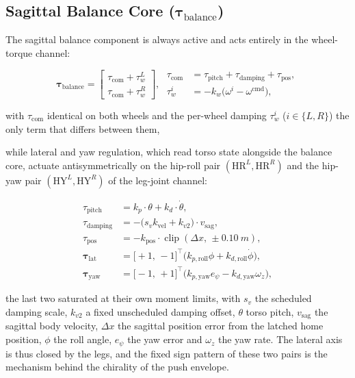 \documentclass{jcd}
\begin{document}
\subsection{Sagittal Balance Core ($\boldsymbol{\tau}_{\text{balance}}$)}
\label{sec:balance_core}

The sagittal balance component is always active and acts entirely in the
wheel-torque channel:

\begin{equation}
\boldsymbol{\tau}_{\text{balance}} =
\begin{bmatrix}
\tau_{\text{com}} + \tau_{w}^{L} \\
\tau_{\text{com}} + \tau_{w}^{R}
\end{bmatrix},
\;
\begin{aligned}
\tau_{\text{com}} &= \tau_{\text{pitch}} + \tau_{\text{damping}} + \tau_{\text{pos}},\\
\tau_{w}^{i} &= -k_{w}\big(\omega^{i} - \omega^{\text{cmd}}\big),
\end{aligned}
\label{eq:balance}
\end{equation}

with $\tau_{\text{com}}$ identical on both wheels and the per-wheel damping
$\tau_{w}^{i}$ ($i\in\{L,R\}$) the only term that differs between them,

while lateral and yaw regulation, which read torso state alongside the balance
core, actuate antisymmetrically on the hip-roll pair
$(\mathrm{HR}^L,\mathrm{HR}^R)$ and the hip-yaw pair
$(\mathrm{HY}^L,\mathrm{HY}^R)$ of the leg-joint channel:

\begin{align}
\tau_{\text{pitch}} &= k_p\cdot\theta + k_d\cdot\dot{\theta},\\
\tau_{\text{damping}} &= -\big(s_v k_{\text{vel}} + k_{v2}\big)\cdot v_{\text{sag}},\\
\tau_{\text{pos}} &= -k_{\text{pos}}\cdot\operatorname{clip}(\Delta x,\,\pm\SI{0.10}{m}),\\
\boldsymbol{\tau}_{\text{lat}} &= \big[{+}1,\,{-}1\big]^{\!\top}
\big(k_{p,\text{roll}}\phi + k_{d,\text{roll}}\dot{\phi}\big),
\label{eq:lat_yaw}\\
\boldsymbol{\tau}_{\text{yaw}} &= \big[{-}1,\,{+}1\big]^{\!\top}
\big(k_{p,\text{yaw}}e_\psi - k_{d,\text{yaw}}\omega_z\big),
\end{align}

the last two saturated at their own moment limits, with $s_v$ the scheduled
damping scale, $k_{v2}$ a fixed unscheduled damping offset, $\theta$ torso pitch,
$v_{\text{sag}}$ the sagittal body velocity, $\Delta x$ the sagittal position
error from the latched home position, $\phi$ the roll angle, $e_\psi$ the yaw
error and $\omega_z$ the yaw rate. The lateral axis is thus closed by the legs,
and the fixed sign pattern of these two pairs is the mechanism behind the
chirality of the push envelope.
\end{document}
